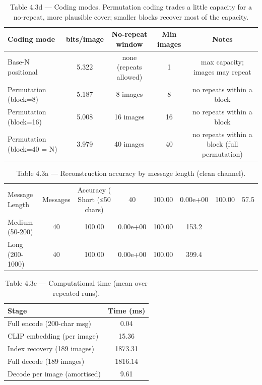 \begin{table}[htbp]
\centering
\caption{Table 4.3d — Coding modes. Permutation coding trades a little capacity for a no-repeat, more plausible cover; smaller blocks recover most of the capacity.}
\label{tab:table_4_3_coding_modes}
\begin{tabular}{lcccc}
\hline
Coding mode & bits/image & No-repeat window & Min images & Notes \\
\hline
Base-N positional & 5.322 & none (repeats allowed) & 1 & max capacity; images may repeat \\
Permutation (block=8) & 5.187 & 8 images & 8 & no repeats within a block \\
Permutation (block=16) & 5.008 & 16 images & 16 & no repeats within a block \\
Permutation (block=40 = N) & 3.979 & 40 images & 40 & no repeats within a block (full permutation) \\
\hline
\end{tabular}
\end{table}


\begin{table}[htbp]
\centering
\caption{Table 4.3a — Reconstruction accuracy by message length (clean channel).}
\label{tab:table_4_3_reconstruction}
\begin{tabular}{lccccc}
\hline
Message Length & Messages & Accuracy (%
\hline
Short (≤50 chars) & 40 & 100.00 & 0.00e+00 & 100.00 & 57.5 \\
Medium (50-200) & 40 & 100.00 & 0.00e+00 & 100.00 & 153.2 \\
Long (200-1000) & 40 & 100.00 & 0.00e+00 & 100.00 & 399.4 \\
\hline
\end{tabular}
\end{table}


\begin{table}[htbp]
\centering
\caption{Table 4.3c — Computational time (mean over repeated runs).}
\label{tab:table_4_3_timing}
\begin{tabular}{lc}
\hline
Stage & Time (ms) \\
\hline
Full encode (200-char msg) & 0.04 \\
CLIP embedding (per image) & 15.36 \\
Index recovery (189 images) & 1873.31 \\
Full decode (189 images) & 1816.14 \\
Decode per image (amortised) & 9.61 \\
\hline
\end{tabular}
\end{table}



